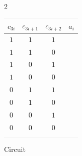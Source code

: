 \begin{center}
\begin{multicols}{2}\begin{tabular}{ccc|c}
$c_{3i}$ & $c_{3i+1}$ & $c_{3i+2}$ & $a_i$ \\
\hline
$1$ & $1$ & $1$ & $\phantom{1}$ \\
$1$ & $1$ & $0$ & $\phantom{1}$ \\
$1$ & $0$ & $1$ & $\phantom{1}$ \\
$1$ & $0$ & $0$ & $\phantom{0}$ \\
$0$ & $1$ & $1$ & $\phantom{1}$ \\
$0$ & $1$ & $0$ & $\phantom{0}$ \\
$0$ & $0$ & $1$ & $\phantom{0}$ \\
$0$ & $0$ & $0$ & $\phantom{0}$ \\\\
\end{tabular}
\columnbreak

Circuit 
\end{multicols}
\end{center}